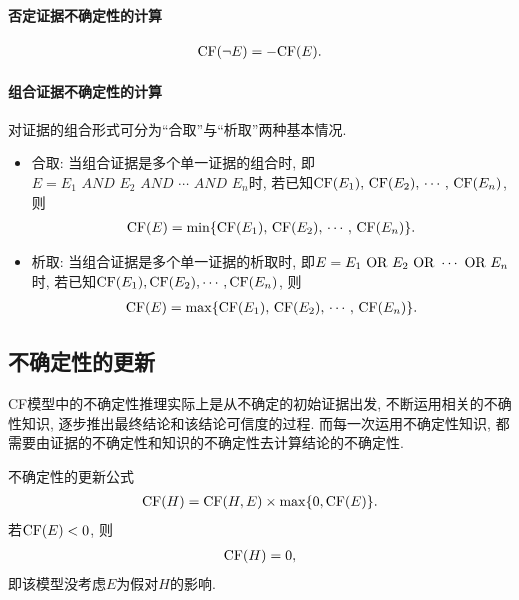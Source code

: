 \paragraph{否定证据不确定性的计算}
\begin{align}
    \textup{CF}(\neg E)=-\textup{CF}(E).
\end{align}
\paragraph{组合证据不确定性的计算}
对证据的组合形式可分为“合取”与“析取”两种基本情况.
\begin{itemize}
    \item 合取: 当组合证据是多个单一证据的组合时, 即 $E=E_1\,\,  AND\,\,    E_2\,\,    AND \,\,   \cdots\,\,     AND \,\,   E_n$时, 若已知$\textup{CF}(E_1),\, \textup{CF}(E_2),\, \cdots,\, \textup{CF}(E_n)$, 则
    \begin{align}
        \textup{CF}(E)=\min\{\textup{CF}(E_1),\, \textup{CF}(E_2),\, \cdots ,\,\textup{CF}(E_n)\}.
    \end{align}
    \item 析取: 当组合证据是多个单一证据的析取时, 即$E=E_1\,\,  \textup{OR}\,\,  E_2 \,\, \textup{OR}\,\,  \cdots \,\,  \textup{OR}\,\, E_n$时, 若已知$\textup{CF}(E_1), \textup{CF}(E_2), \cdots , \textup{CF}(E_n)$, 则
    \begin{align}
        \textup{CF}(E)=\max\{\textup{CF}(E_1),\, \textup{CF}(E_2),\, \cdots ,\,\textup{CF}(E_n)\}.
    \end{align}
\end{itemize}

\subsection{不确定性的更新}
CF模型中的不确定性推理实际上是从不确定的初始证据出发, 不断运用相关的不确性知识, 逐步推出最终结论和该结论可信度的过程.
而每一次运用不确定性知识, 都需要由证据的不确定性和知识的不确定性去计算结论的不确定性.

不确定性的更新公式
\begin{align}
    \textup{CF}(H)=\textup{CF}(H, E)\times \max\{0, \textup{CF}(E)\}.
\end{align}
    若$\textup{CF}(E)<0$, 则
\begin{align}
    \textup{CF}(H)=0,
\end{align}
即该模型没考虑$E$为假对$H$的影响.

